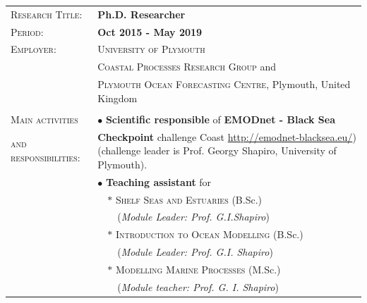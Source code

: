 \documentclass[a4paper, oneside, final]{scrartcl}
\newcommand{\gray}{\rowcolor[gray]{.90}} %
\begin{document}
\begin{tabularx}{0.97\linewidth}{>{\raggedright\scshape}p{4.4cm}|X}
\gray \textsc{Research Title:} & \textbf{Ph.D. Researcher}\\
\gray \textsc{Period:}         & \textbf{Oct 2015 - May 2019}\\
\textsc{Employer:}             & \textsc{University of Plymouth}  \\
                               & \textsc{Coastal Processes Research Group} and \\
                               & \textsc{Plymouth Ocean Forecasting Centre}, Plymouth, United Kingdom \\
                               & \\
\textsc{Main activities}       & $\bullet$ \textbf{Scientific responsible} of \textbf{EMODnet - Black Sea} \\
\textsc{and responsibilities:} & \textbf{Checkpoint} challenge Coast \url{http://emodnet-blacksea.eu/}) (challenge leader is Prof. Georgy Shapiro, University of Plymouth). \\
                               & $\bullet$ \textbf{Teaching assistant} for \\
                               & \ \ $\ast$ \textsc{Shelf Seas and Estuaries} (B.Sc.)\\
                               & \ \ \ \ (\textit{Module Leader: Prof. G.I.Shapiro})\\
                               & \ \ $\ast$ \textsc{Introduction to Ocean Modelling} (B.Sc.)\\
                               & \ \ \ \ (\textit{Module Leader: Prof. G.I. Shapiro})\\
                               & \ \ $\ast$ \textsc{Modelling Marine Processes} (M.Sc.)\\
                               & \ \ \ \ (\textit{Module teacher: Prof. G. I. Shapiro})\\
\end{tabularx}

\end{document}
